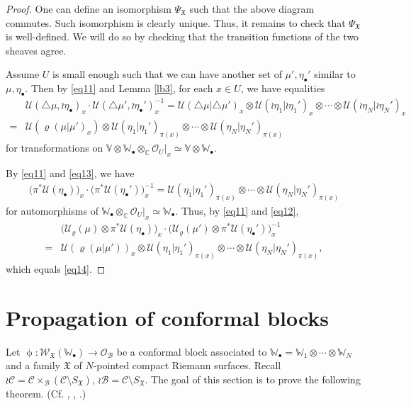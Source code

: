 \documentclass[12pt,a4paper,notitlepage]{article}
\theoremstyle{definition}
\theoremstyle{plain}
\newcommand{\fk}{\mathfrak}
\newcommand{\mc}{\mathcal}
\newcommand{\scr}{\mathscr}
\newcommand{\SX}{{S_{\fk X}}}
\newcommand{\blt}{\bullet}
\newcommand{\Vbb}{\mathbb V}
\newcommand{\Wbb}{\mathbb W}
\newcommand{\Cbb}{\mathbb C}
\numberwithin{equation}{section}
\begin{document}
\begin{proof}
One can define an isomorphism $\Psi_{\fk X}$ such that the above diagram commutes. Such isomorphism is clearly unique. Thus, it remains to check that $\Psi_{\fk X}$ is well-defined. We will do so by checking that the transition functions of the two sheaves agree.

Assume $U$ is small enough such that we can have another set of $\mu',\eta_\blt'$ similar to $\mu,\eta_\blt$. Then by \eqref{eq11} and Lemma \ref{lb3}, for each $x\in U$, we have equalities
\begin{align}
&\mc U(\triangle\mu,\wr\eta_\blt)_x\cdot \mc U(\triangle\mu',\wr\eta_\blt')_x^{-1}=\mc U(\triangle\mu|\triangle\mu')_x\otimes\mc U(\wr\eta_1|\wr\eta_1')_x\otimes\cdots\otimes \mc U(\wr\eta_N|\wr\eta_N')_x \nonumber \\
=&\mc U(\varrho(\mu|\mu')_x)\otimes \mc U(\eta_1|\eta_1')_{\pi(x)}\otimes\cdots\otimes \mc U(\eta_N|\eta_N')_{\pi(x)}\label{eq14}
\end{align}
for transformations on $\Vbb\otimes\Wbb_\blt\otimes_\Cbb\scr O_U|_x\simeq \Vbb\otimes\Wbb_\blt$. 

By \eqref{eq11} and \eqref{eq13},  we have 
\begin{align}
	\big(\pi^*\mc U(\eta_\blt)\big)_x\cdot \big(\pi^*\mc U(\eta_\blt')\big)^{-1}_x=\mc U(\eta_1|\eta_1')_{\pi(x)}\otimes\cdots\otimes \mc U(\eta_N|\eta_N')_{\pi(x)}	
\end{align}
for automorphisms of $\Wbb_\blt\otimes_\Cbb\scr O_U|_x\simeq\Wbb_\blt$. Thus, by \eqref{eq11} and \eqref{eq12},
\begin{align*}
&\big(\mc U_\varrho(\mu)\otimes\pi^*\mc U(\eta_\blt) \big)_x\cdot\big(\mc U_\varrho(\mu')\otimes\pi^*\mc U(\eta_\blt')\big)_x^{-1}\\
=&	\mc U(\varrho(\mu|\mu'))_x\otimes \mc U(\eta_1|\eta_1')_{\pi(x)}\otimes\cdots\otimes \mc U(\eta_N|\eta_N')_{\pi(x)},
\end{align*}
which equals \eqref{eq14}.
\end{proof}









\section{Propagation of conformal blocks}\label{lb22}

Let $\upphi:\scr W_{\fk X}(\Wbb_\blt)\rightarrow\scr O_{\mc B}$ be a conformal block associated to $\Wbb_\blt=\Wbb_1\otimes\cdots\otimes\Wbb_N$ and a family $\fk X$ of $N$-pointed compact Riemann surfaces. Recall $\wr\mc C=\mc C\times_{\mc B}(\mc C\setminus\SX)$, $\wr\mc B=\mc C\setminus\SX$. The goal of this section is to prove the following theorem. (Cf. \cite[Sec. 6]{Zhu94}, \cite[Thm. 10.3.1]{FB04}, \cite[Thm. 3.6]{Cod19}.)
\end{document}
